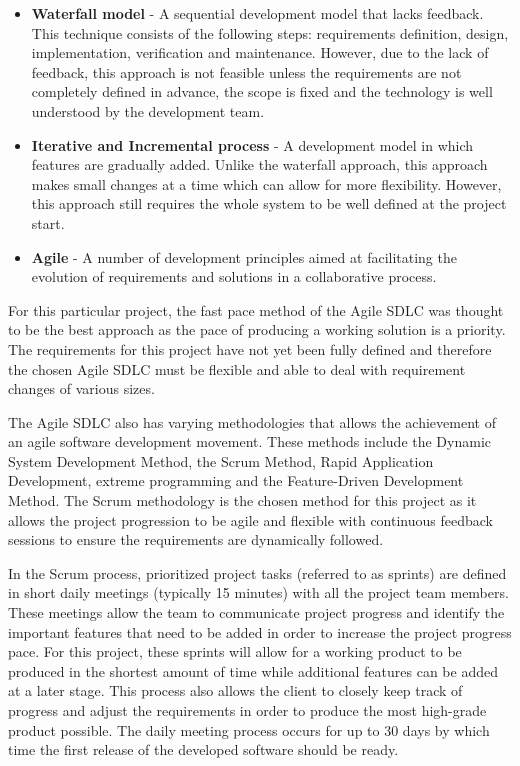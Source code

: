 \documentclass[12pt,onecolumn]{article}
\begin{document}
	\begin{itemize}
		\item \textbf{Waterfall model} - A sequential development model that lacks feedback. This technique consists of the following steps: requirements definition, design, implementation, verification and maintenance. However, due to the lack of feedback, this approach is not feasible unless the requirements are not completely defined in advance, the scope is fixed and the technology is well understood by the development team.

		\item \textbf{Iterative and Incremental process} - A development model in which features are gradually added. Unlike the waterfall approach, this approach makes small changes at a time which can allow for more flexibility. However, this approach still requires the whole system to be well defined at the project start.

		\item \textbf{Agile} - A number of development principles aimed at facilitating the evolution of requirements and solutions in a collaborative process.

	\end{itemize}

	For this particular project, the fast pace method of the Agile SDLC was thought to be the best approach as the pace of producing a working solution is a priority. The requirements for this project have not yet been fully defined and therefore the chosen Agile SDLC must be flexible and able to deal with requirement changes of various sizes.

	The Agile SDLC also has varying methodologies that allows the achievement of an agile software development movement. These methods include the Dynamic System Development Method, the Scrum Method, Rapid Application Development, extreme programming and the Feature-Driven Development Method. The Scrum methodology is the chosen method for this project as it allows the project progression to be agile and flexible with continuous feedback sessions to ensure the requirements are dynamically followed\cite{Kinsey}.

	In the Scrum process, prioritized project tasks (referred to as sprints) are defined in short daily meetings (typically 15 minutes) with all the project team members. These meetings allow the team to communicate project progress and identify the important features that need to be added in order to increase the project progress pace. For this project, these sprints will allow for a working product to be produced in the shortest amount of time while additional features can be  added at a later stage. This process also allows the client to closely keep track of progress and adjust the requirements in order to produce the most high-grade product possible. The daily meeting process occurs for up to 30 days by which time the first release of the developed software should be ready.   
\end{document}
